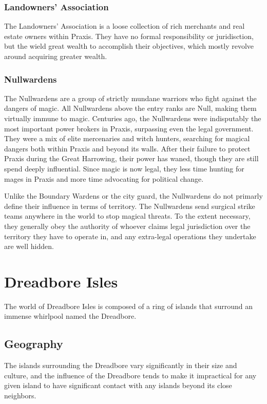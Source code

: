         \subsubsection{Landowners' Association}
            The Landowners' Association is a loose collection of rich merchants and real estate owners within Praxis.
            They have no formal responsibility or juridisction, but the wield great wealth to accomplish their objectives, which mostly revolve around acquiring greater wealth.

        \subsubsection{Nullwardens}
            The Nullwardens are a group of strictly mundane warriors who fight against the dangers of magic.
            All Nullwardens above the entry ranks are Null, making them virtually immune to magic.
            Centuries ago, the Nullwardens were indisputably the most important power brokers in Praxis, surpassing even the legal government.
            They were a mix of elite mercenaries and witch hunters, searching for magical dangers both within Praxis and beyond its walls.
            After their failure to protect Praxis during the Great Harrowing, their power has waned, though they are still spend deeply influential.
            Since magic is now legal, they less time hunting for mages in Praxis and more time advocating for political change.

            Unlike the Boundary Wardens or the city guard, the Nullwardens do not primarly define their influence in terms of territory.
            The Nullwardens send surgical strike teams anywhere in the world to stop magical threats.
            To the extent necessary, they generally obey the authority of whoever claims legal jurisdiction over the territory they have to operate in, and any extra-legal operations they undertake are well hidden.

\section{Dreadbore Isles}
    The world of Dreadbore Isles is composed of a ring of islands that surround an immense whirlpool named the Dreadbore.

    \subsection{Geography}
        The islands surrounding the Dreadbore vary significantly in their size and culture, and the influence of the Dreadbore tends to make it impractical for any given island to have significant contact with any islands beyond its close neighbors.


